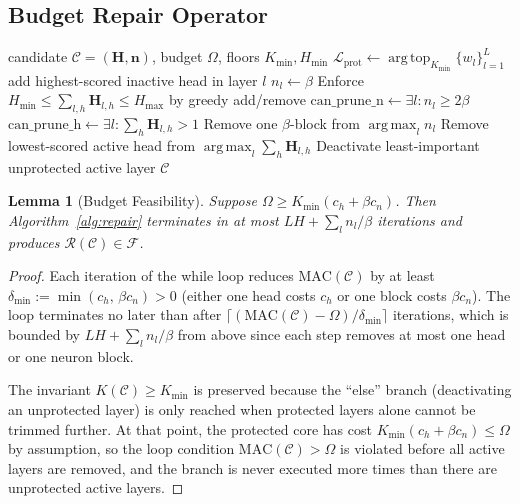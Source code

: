 \documentclass{article}
\newtheorem{lemma}[theorem]{Lemma}
\newcommand{\Hb}{\mathbf{H}}
\newcommand{\nb}{\mathbf{n}}
\newcommand{\Cc}{\mathcal{C}}
\newcommand{\Fc}{\mathcal{F}}
\newcommand{\Lc}{\mathcal{L}}
\newcommand{\MAC}{\mathrm{MAC}}
\newcommand{\argmax}{\mathop{\mathrm{arg\,max}}}
\newcommand{\argtop}{\mathop{\mathrm{arg\,top}}}
\begin{document}
\subsection{Budget Repair Operator}
\label{sec:repair}

\begin{algorithm}[t]
\caption{Budget Repair $\mathcal{R}(\Cc; \Omega, K_{\min}, H_{\min}, H_{\max})$}
\label{alg:repair}
\begin{algorithmic}[1]
\Require candidate $\Cc=(\Hb,\nb)$, budget $\Omega$, floors $K_{\min}, H_{\min}$
\State $\Lc_{\mathrm{prot}} \gets \argtop_{K_{\min}} \{w_l\}_{l=1}^L$
\For{$l \in \Lc_{\mathrm{prot}}$}
  \If{$\sum_h\Hb_{l,h}<1$} add highest-scored inactive head in layer $l$ \EndIf
   $n_l \gets \beta$ \EndIf
\EndFor
\State Enforce $H_{\min} \le \sum_{l,h}\Hb_{l,h} \le H_{\max}$ by greedy add/remove
\While{$\MAC(\Cc) > \Omega$}
  \State $\text{can\_prune\_n} \gets \exists l: n_l \ge 2\beta$
  \State $\text{can\_prune\_h} \gets \exists l: \sum_h\Hb_{l,h}>1$
    \State Remove one $\beta$-block from $\argmax_l n_l$
    \State Remove lowest-scored active head from $\argmax_l \sum_h\Hb_{l,h}$
  \Else
    \State Deactivate least-important unprotected active layer
  \EndIf
\EndWhile
\State \Return $\Cc$
\end{algorithmic}
\end{algorithm}

\begin{lemma}[Budget Feasibility]
\label{lem:repair}
Suppose $\Omega \ge K_{\min}(c_h + \beta c_n)$.  Then
Algorithm~\ref{alg:repair} terminates in at most
$LH + \sum_l n_l/\beta$ iterations and produces
$\mathcal{R}(\Cc)\in\Fc$.
\end{lemma}
\begin{proof}
Each iteration of the while loop reduces $\MAC(\Cc)$ by at least
$\delta_{\min}:=\min(c_h,\, \beta c_n)>0$ (either one head costs $c_h$
or one block costs $\beta c_n$).  The loop terminates no later than
after $\lceil(\MAC(\Cc)-\Omega)/\delta_{\min}\rceil$ iterations, which
is bounded by $LH+\sum_l n_l/\beta$ from above since each step removes
at most one head or one neuron block.

The invariant $K(\Cc)\ge K_{\min}$ is preserved because the ``else''
branch (deactivating an unprotected layer) is only reached when
protected layers alone cannot be trimmed further.  At that point,
the protected core has cost $K_{\min}(c_h+\beta c_n)\le\Omega$
by assumption, so the loop condition $\MAC(\Cc)>\Omega$ is violated
before all active layers are removed, and the branch is never executed
more times than there are unprotected active layers.
\end{proof}
\end{document}
